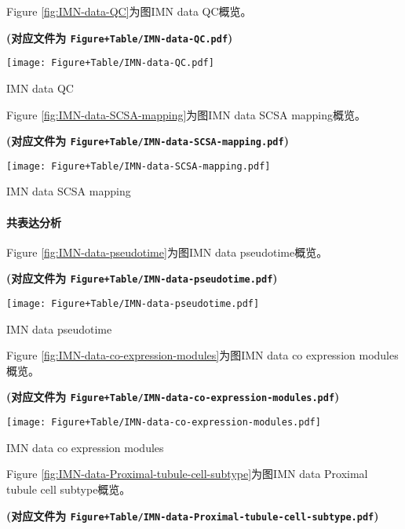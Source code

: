 \documentclass[
]{article}
\begin{document}
Figure \ref{fig:IMN-data-QC}为图IMN data QC概览。

\textbf{(对应文件为 \texttt{Figure+Table/IMN-data-QC.pdf})}

\def\@captype{figure}
\begin{center}
\texttt{[image: Figure+Table/IMN-data-QC.pdf]}
\caption{IMN data QC}\label{fig:IMN-data-QC}
\end{center}

Figure \ref{fig:IMN-data-SCSA-mapping}为图IMN data SCSA mapping概览。

\textbf{(对应文件为 \texttt{Figure+Table/IMN-data-SCSA-mapping.pdf})}

\def\@captype{figure}
\begin{center}
\texttt{[image: Figure+Table/IMN-data-SCSA-mapping.pdf]}
\caption{IMN data SCSA mapping}\label{fig:IMN-data-SCSA-mapping}
\end{center}

\hypertarget{ux5171ux8868ux8fbeux5206ux6790-2}{%
\paragraph{共表达分析}\label{ux5171ux8868ux8fbeux5206ux6790-2}}

Figure \ref{fig:IMN-data-pseudotime}为图IMN data pseudotime概览。

\textbf{(对应文件为 \texttt{Figure+Table/IMN-data-pseudotime.pdf})}

\def\@captype{figure}
\begin{center}
\texttt{[image: Figure+Table/IMN-data-pseudotime.pdf]}
\caption{IMN data pseudotime}\label{fig:IMN-data-pseudotime}
\end{center}

Figure \ref{fig:IMN-data-co-expression-modules}为图IMN data co expression modules概览。

\textbf{(对应文件为 \texttt{Figure+Table/IMN-data-co-expression-modules.pdf})}

\def\@captype{figure}
\begin{center}
\texttt{[image: Figure+Table/IMN-data-co-expression-modules.pdf]}
\caption{IMN data co expression modules}\label{fig:IMN-data-co-expression-modules}
\end{center}

Figure \ref{fig:IMN-data-Proximal-tubule-cell-subtype}为图IMN data Proximal tubule cell subtype概览。

\textbf{(对应文件为 \texttt{Figure+Table/IMN-data-Proximal-tubule-cell-subtype.pdf})}
\end{document}
